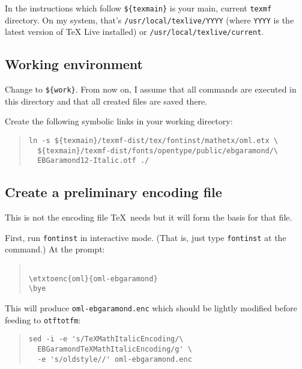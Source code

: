 \documentclass[12pt,british,a4paper]{article}
\begin{document}
In the instructions which follow \verb|${texmain}| is your main, current \verb|texmf| directory.
On my system, that's \verb|/usr/local/texlive/YYYY| (where \verb|YYYY| is the latest version of TeX Live installed) or \verb|/usr/local/texlive/current|.

\subsection{Working environment}\label{subsec:amgylchedd}

Change to \verb|${work}|.
From now on, I assume that all commands are executed in this directory and that all created files are saved there.

Create the following symbolic links in your working directory:

\begin{quote}
\begin{verbatim}
ln -s ${texmain}/texmf-dist/tex/fontinst/mathetx/oml.etx \
  ${texmain}/texmf-dist/fonts/opentype/public/ebgaramond/\
  EBGaramond12-Italic.otf ./
\end{verbatim}
\end{quote}

\subsection{Create a preliminary encoding file}\label{subsec:creu-enc}
This is not the encoding file \TeX\ needs but it will form the basis for that file.

First, run \verb|fontinst| in interactive mode.
(That is, just type \verb|fontinst| at the command.)
At the prompt:
\begin{quote}
\begin{verbatim}

\etxtoenc{oml}{oml-ebgaramond}
\bye
\end{verbatim}
\end{quote}

This will produce \verb|oml-ebgaramond.enc| which should be lightly modified before feeding to \verb|otftotfm|:

\begin{quote}
\begin{verbatim}
sed -i -e 's/TeXMathItalicEncoding/\
  EBGaramondTeXMathItalicEncoding/g' \
  -e 's/oldstyle//' oml-ebgaramond.enc
\end{verbatim}
\end{quote}
\end{document}
